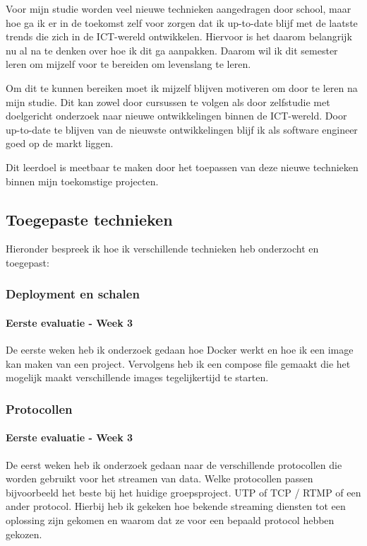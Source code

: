Voor mijn studie worden veel nieuwe technieken aangedragen door school, maar hoe ga ik er in de toekomst zelf voor
zorgen dat ik up-to-date blijf met de laatste trends die zich in de ICT-wereld ontwikkelen.
Hiervoor is het daarom belangrijk nu al na te denken over hoe ik dit ga aanpakken.
Daarom wil ik dit semester leren om mijzelf voor te bereiden om levenslang te leren.

Om dit te kunnen bereiken moet ik mijzelf blijven motiveren om door te leren na mijn studie.
Dit kan zowel door cursussen te volgen als door zelfstudie met doelgericht onderzoek naar nieuwe
ontwikkelingen binnen de ICT-wereld.
Door up-to-date te blijven van de nieuwste ontwikkelingen blijf ik als software engineer goed op de markt liggen.

Dit leerdoel is meetbaar te maken door het toepassen van deze nieuwe technieken binnen mijn toekomstige projecten.

\subsection{Toegepaste technieken}\label{subsec:toegepaste-technieken}
Hieronder bespreek ik hoe ik verschillende technieken heb onderzocht en toegepast:
	\subsubsection{Deployment en schalen}\label{subsec:deployen-en-schalen}
	\paragraph{Eerste evaluatie - Week 3}\label{subsubsec:eerste-evaluatie---week-3}
	De eerste weken heb ik onderzoek gedaan hoe Docker werkt en hoe ik een image kan maken van een project.
	Vervolgens heb ik een compose file gemaakt die het mogelijk maakt verschillende images tegelijkertijd te starten.

    \subsubsection{Protocollen}\label{subsec:protocollen}
	\paragraph{Eerste evaluatie - Week 3}
	De eerst weken heb ik onderzoek gedaan naar de verschillende protocollen die worden gebruikt voor het streamen
	van data.
	Welke protocollen passen bijvoorbeeld het beste bij het huidige groepsproject.
	UTP of TCP / RTMP of een ander protocol.
	Hierbij heb ik gekeken hoe bekende streaming diensten tot een oplossing zijn gekomen en waarom dat ze voor een
	bepaald protocol hebben gekozen.


